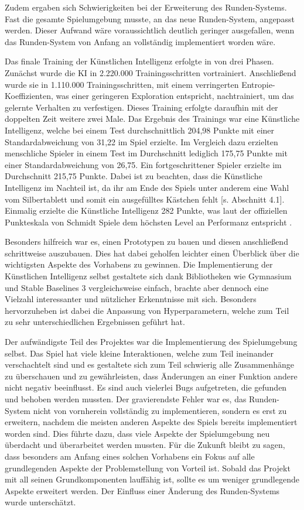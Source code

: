 Zudem ergaben sich Schwierigkeiten bei der Erweiterung des Runden-Systems. Fast die gesamte Spielumgebung musste, an das neue Runden-System, angepasst werden. Dieser Aufwand wäre voraussichtlich deutlich geringer ausgefallen, wenn das Runden-System von Anfang an vollständig implementiert worden wäre.

Das finale Training der Künstlichen Intelligenz erfolgte in von drei Phasen. Zunächst wurde die KI in 2.220.000 Trainingsschritten vortrainiert. Anschließend wurde sie in 1.110.000 Trainingsschritten, mit einem verringerten Entropie-Koeffizienten, was einer geringeren Exploration entspricht, nachtrainiert, um das gelernte Verhalten zu verfestigen. Dieses Training erfolgte daraufhin mit der doppelten Zeit weitere zwei Male. Das Ergebnis des Trainings war eine Künstliche Intelligenz, welche bei einem Test durchschnittlich 204,98 Punkte mit einer Standardabweichung von 31,22 im Spiel erzielte. Im Vergleich dazu erzielten menschliche Spieler in einem Test im Durchschnitt lediglich 175,75 Punkte mit einer Standardabweichung von 26,75. Ein fortgeschrittener Spieler erzielte im Durchschnitt 215,75 Punkte. Dabei ist zu beachten, dass die Künstliche Intelligenz im Nachteil ist, da ihr am Ende des Spiels unter anderem eine Wahl vom Silbertablett und somit ein ausgefülltes Kästchen fehlt [s. Abschnitt 4.1]. Einmalig erzielte die Künstliche Intelligenz 282 Punkte, was laut der offiziellen Punkteskala von Schmidt Spiele dem höchsten Level an Performanz entspricht \cite{schmidtspiele_ganzschonclever}.

Besonders hilfreich war es, einen Prototypen zu bauen und diesen anschließend schrittweise auszubauen. Dies hat dabei geholfen leichter einen Überblick über die wichtigsten Aspekte des Vorhabens zu gewinnen. Die Implementierung der Künstlichen Intelligenz selbst gestaltete sich dank Bibliotheken wie Gymnasium und Stable Baselines 3 vergleichsweise einfach, brachte aber dennoch eine Vielzahl interessanter und nützlicher Erkenntnisse mit sich. Besonders hervorzuheben ist dabei die Anpassung von Hyperparametern, welche zum Teil zu sehr unterschiedlichen Ergebnissen geführt hat. 

Der aufwändigste Teil des Projektes war die Implementierung des Spielumgebung selbst. Das Spiel hat viele kleine Interaktionen, welche zum Teil ineinander verschachtelt sind und es gestaltete sich zum Teil schwierig alle Zusammenhänge zu überschauen und zu gewährleisten, dass Änderungen an einer Funktion andere nicht negativ beeinflusst. Es sind auch vielerlei Bugs aufgetreten, die gefunden und behoben werden mussten. Der gravierendste Fehler war es, das Runden-System nicht von vornherein vollständig zu implementieren, sondern es erst zu erweitern, nachdem die meisten anderen Aspekte des Spiels bereits implementiert worden sind. Dies führte dazu, dass viele Aspekte der Spielumgebung neu überdacht und überarbeitet werden mussten. Für die Zukunft bleibt zu sagen, dass besonders am Anfang eines solchen Vorhabens ein Fokus auf alle grundlegenden Aspekte der Problemstellung von Vorteil ist. Sobald das Projekt mit all seinen Grundkomponenten lauffähig ist, sollte es um weniger grundlegende Aspekte erweitert werden. Der Einfluss einer Änderung des Runden-Systems wurde unterschätzt.\\

